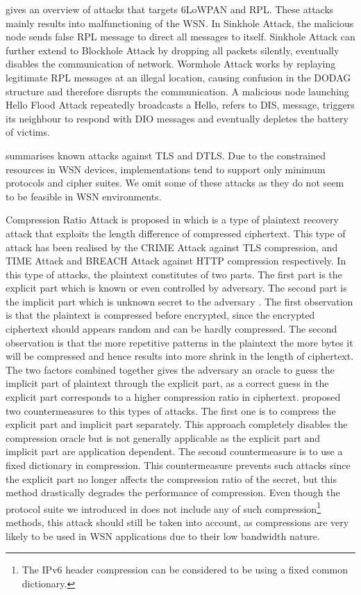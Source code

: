 \cite{6lpRplAtk} gives an overview of attacks that targets 6LoWPAN and RPL. These attacks mainly results into malfunctioning of the WSN. In Sinkhole Attack\cite{Sinkhole}, the malicious node sends false RPL message to direct all messages to itself. Sinkhole Attack can further extend to Blockhole Attack\cite{Blackhole} by dropping all packets silently, eventually disables the communication of network. Wormhole Attack\cite{Wormhole} works by replaying legitimate RPL messages at an illegal location, causing confusion in the DODAG structure and therefore disrupts the communication. A malicious node launching Hello Flood Attack repeatedly broadcasts a Hello, refers to DIS, message, triggers its neighbour to respond with DIO messages and eventually depletes the battery of victims.

\cite{rfc7457} summarises known attacks  against TLS and DTLS. Due to the constrained resources in WSN devices, implementations tend to support only  minimum protocols and cipher suites. We omit some of these attacks as they do not seem to be feasible in WSN environments.

Compression Ratio Attack is proposed in \cite{CompressionRationAttack} which is a type of plaintext recovery attack that exploits the length difference of compressed ciphertext. This type of attack has been realised by the CRIME\cite{CRIME} Attack against TLS compression, and TIME\cite{TIME} Attack and BREACH\cite{BREACH} Attack against HTTP compression respectively. In this type of attacks, the plaintext constitutes of two parts. The first part is the explicit part which is known or even controlled by adversary. The second part is the implicit part which is unknown secret to the adversary . The first observation is that the plaintext is compressed before encrypted, since the encrypted ciphertext should appears random and can be hardly compressed. The second observation is that the more repetitive patterns in the plaintext the more bytes it will be compressed and hence results into more shrink in the length of ciphertext. The two factors combined together gives the adversary an oracle to guess the implicit part of plaintext through the explicit part, as a correct guess in the explicit part corresponds to a higher compression ratio in ciphertext.\cite{CompressionCountermeasure} proposed two countermeasures to this types of attacks. The first one is to compress the explicit part and implicit part separately. This approach completely disables the compression oracle but is not generally applicable as the explicit part and implicit part are application dependent. The second countermeasure is to use a fixed dictionary in compression. This countermeasure prevents such attacks since the explicit part no longer affects the compression ratio of the secret, but this method drastically degrades the performance of compression. Even though the protocol suite we introduced in  does not include any of such compression\footnote{The IPv6 header compression can be considered to be using a fixed common dictionary.} methods, this attack should still be taken into account, as compressions are very likely to be used in WSN applications due to their low bandwidth nature. 

